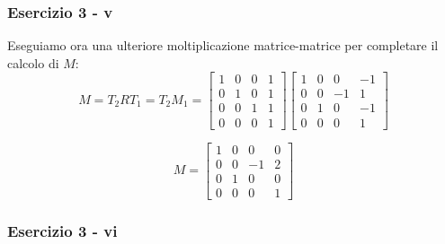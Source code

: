 \documentclass{beamer}
\newcommand{\fig}{figures} %
\begin{document}
\begin{frame}
\frametitle{Esercizio 3 - v}
Eseguiamo ora una ulteriore moltiplicazione matrice-matrice per completare il calcolo di $M$:
\begin{displaymath}
M    
    =
    T_2 R T_1
    =
    T_2 M_1
    =
\begin{bmatrix}
    1 & 0 &  0 & 1 \\
    0 & 1 &  0 & 1 \\
    0 & 0 &  1 & 1 \\ 
    0 & 0 &  0 & 1
\end{bmatrix}
\begin{bmatrix}
    1 & 0 &  0 & -1 \\
    0 & 0 & -1 &  1 \\
    0 & 1 &  0 & -1 \\ 
    0 & 0 &  0 &  1
\end{bmatrix}
\end{displaymath}

    \begin{displaymath}
   M = 
\begin{bmatrix}
    1 & 0 &  0 &  0 \\
    0 & 0 & -1 &  2 \\
    0 & 1 &  0 &  0 \\ 
    0 & 0 &  0 &  1
\end{bmatrix}
\end{displaymath}
\end{frame}

\begin{frame}
\frametitle{Esercizio 3 - vi}
    \vspace{-0.75cm}
\begin{center}
\end{center}
\end{frame}
\end{document}
